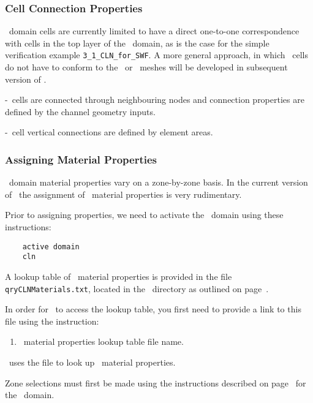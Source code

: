 \subsubsection{Cell Connection Properties}  

\cln\ domain cells are currently limited to have a direct one-to-one correspondence with cells in the top layer of the \gwf\ domain, as is the case for the simple verification example \texttt{3\_1\_CLN\_for\_SWF}.  A more general approach, in which \cln\ cells do not have to conform to the \gwf\ or \swf\ meshes will be developed in subsequent version of \mut.

\cln-\cln\ cells are connected through neighbouring nodes and connection properties are defined by the channel geometry inputs. 

\cln-\gwf\ cell vertical connections are defined by element areas.

\subsubsection{Assigning Material Properties}  
\cln\ domain material properties vary on a zone-by-zone basis.  In the current version of \mut\, the assignment of \cln\ material properties is very rudimentary.

Prior to assigning properties, we need to activate the \cln\ domain using these instructions:
\begin{verbatim}
    active domain
    cln
\end{verbatim}

A lookup table of \cln\ material properties  is provided in the file \texttt{qryCLNMaterials.txt}, located in the \bin\ directory as outlined on page~\pageref{page:userbin}.

In order for \mut\ to access the lookup table, you first need to provide a link to this file using the instruction:

    {
        \squish
        \begin{enumerate}
        \item {}  \cln\ material properties lookup table file name.
        \end{enumerate}
          \mut\ uses the file  to look up \cln\ material properties.
    }

Zone selections must first be made using the instructions described on page~\pageref{page:zoneSelect} for the \gwf\ domain.

